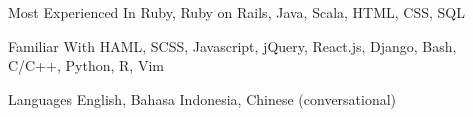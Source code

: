 


\begin{cvskills}


	\cvskill
	{Most Experienced In}
	{Ruby, Ruby on Rails, Java, Scala, HTML, CSS, SQL}


	\cvskill
	{Familiar With}
	{HAML, SCSS, Javascript, jQuery, React.js, Django, Bash, C/C++, Python, R, Vim}


	\cvskill
	{Languages}
	{English, Bahasa Indonesia, Chinese (conversational)}


\end{cvskills}
